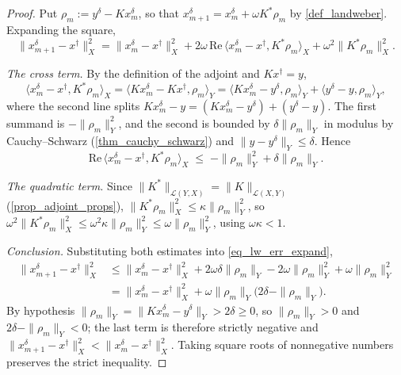 \documentclass[a4paper]{report}
\theoremstyle{plain}
\theoremstyle{definition}
\theoremstyle{remark}
\newcommand{\Ll}{\mathcal{L}}
\newcommand{\dg}{^{\dagger}}
\begin{document}
\begin{proof}
  Put $\rho_m := y^{\delta} - Kx^{\delta}_m$, so that
  $x^{\delta}_{m+1} = x^{\delta}_m + \omega K^{*}\rho_m$ by \cref{def_landweber}.
  Expanding the square,
  \begin{equation}\label{eq_lw_err_expand}
    \|x^{\delta}_{m+1} - x\dg\|_X^{2}
      = \|x^{\delta}_m - x\dg\|_X^{2}
        + 2\omega\,\mathrm{Re}\,\langle x^{\delta}_m - x\dg, K^{*}\rho_m\rangle_X
        + \omega^{2}\|K^{*}\rho_m\|_X^{2} .
  \end{equation}

  \emph{The cross term.}  By the definition of the adjoint and $Kx\dg = y$,
  \[
    \langle x^{\delta}_m - x\dg, K^{*}\rho_m\rangle_X
      = \langle K x^{\delta}_m - Kx\dg, \rho_m\rangle_Y
      = \langle Kx^{\delta}_m - y^{\delta}, \rho_m\rangle_Y
        + \langle y^{\delta} - y, \rho_m\rangle_Y ,
  \]
  where the second line splits $Kx^{\delta}_m - y = (Kx^{\delta}_m - y^{\delta}) +
  (y^{\delta} - y)$.  The first summand is $-\|\rho_m\|_Y^{2}$, and the second is bounded
  by $\delta\|\rho_m\|_Y$ in modulus by Cauchy--Schwarz (\cref{thm_cauchy_schwarz}) and
  $\|y - y^{\delta}\|_Y \le \delta$.  Hence
  \[
    \mathrm{Re}\,\langle x^{\delta}_m - x\dg, K^{*}\rho_m\rangle_X
      \;\le\; -\|\rho_m\|_Y^{2} + \delta\|\rho_m\|_Y .
  \]

  \emph{The quadratic term.}  Since $\|K^{*}\|_{\Ll(Y,X)} = \|K\|_{\Ll(X,Y)}$
  (\cref{prop_adjoint_props}), $\|K^{*}\rho_m\|_X^{2} \le \kappa\|\rho_m\|_Y^{2}$, so
  $\omega^{2}\|K^{*}\rho_m\|_X^{2} \le \omega^{2}\kappa\|\rho_m\|_Y^{2} \le
  \omega\|\rho_m\|_Y^{2}$, using $\omega\kappa < 1$.

  \emph{Conclusion.}  Substituting both estimates into \eqref{eq_lw_err_expand},
  \[
    \begin{aligned}
      \|x^{\delta}_{m+1} - x\dg\|_X^{2}
        &\le \|x^{\delta}_m - x\dg\|_X^{2}
          + 2\omega\delta\|\rho_m\|_Y - 2\omega\|\rho_m\|_Y^{2}
          + \omega\|\rho_m\|_Y^{2} \\
        &= \|x^{\delta}_m - x\dg\|_X^{2}
          + \omega\|\rho_m\|_Y\bigl(2\delta - \|\rho_m\|_Y\bigr) .
    \end{aligned}
  \]
  By hypothesis $\|\rho_m\|_Y = \|Kx^{\delta}_m - y^{\delta}\|_Y > 2\delta \ge 0$, so
  $\|\rho_m\|_Y > 0$ and $2\delta - \|\rho_m\|_Y < 0$; the last term is therefore strictly
  negative and
  $\|x^{\delta}_{m+1} - x\dg\|_X^{2} < \|x^{\delta}_m - x\dg\|_X^{2}$.  Taking square
  roots of nonnegative numbers preserves the strict inequality.
\end{proof}
\end{document}
